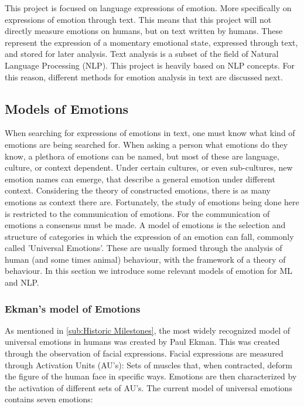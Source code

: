 This project is focused on language expressions of emotion. More specifically on expressions of emotion through text. This means that this project will not directly measure emotions on humans, but on text written by humans. These represent the expression of a momentary emotional state, expressed through text, and stored for later analysis. Text analysis is a subset of the field of Natural Language Processing (NLP). This project is heavily based on NLP concepts. For this reason, different methods for emotion analysis in text are discussed next.

\subsection{Models of Emotions}\label{sub:Models of Emotions}
When searching for expressions of emotions in text, one must know what kind of emotions are being searched for. When asking a person what emotions do they know, a plethora of emotions can be named, but most of these are language, culture, or context dependent. Under certain cultures, or even sub-cultures, new emotion names can emerge, that describe a general emotion under different context. Considering the theory of constructed emotions, there is as many emotions as context there are. Fortunately, the study of emotions being done here is restricted to the communication of emotions. For the communication of emotions a consensus must be made.
A model of emotions is the selection and structure of categories in which the expression of an emotion can fall, commonly called 'Universal Emotions'. These are usually formed through the analysis of human (and some times animal) behaviour, with the framework of a theory of behaviour. In this section we introduce some relevant models of emotion for ML and NLP.

\subsubsection{Ekman's model of Emotions}\label{subs:Ekman's model of Emotions}
As mentioned in \ref{sub:Historic Milestones}, the most widely recognized model of universal emotions in humans was created by Paul Ekman\cite{ekman1992basic}. This was created through the observation of facial expressions. Facial expressions are measured through Activation Units (AU's): Sets of muscles that, when contracted, deform the figure of the human face in specific ways. Emotions are then characterized by the activation of different sets of AU's. The current model of universal emotions contains seven emotions:

